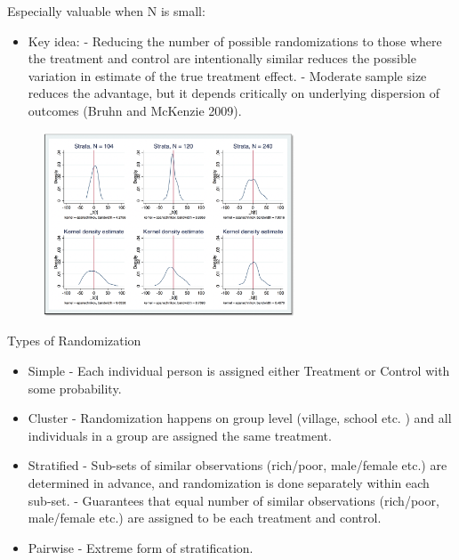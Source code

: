 \documentclass[aspectratio=169]{beamer}
\begin{document}
\begin{frame}[fragile]{Especially valuable when N is small:}
\begin{multicols}{2}	
	
	\begin{itemize}[<default overlay specification>]	
		\item<1>  Key idea:
		\newline - Reducing the number of possible randomizations to those where the treatment and control are intentionally similar reduces the possible variation in estimate of the true treatment effect.
		\newline - Moderate sample size reduces the advantage, but it depends critically on underlying dispersion of outcomes (Bruhn and McKenzie 2009).
	\end{itemize}
	
	\begin{figure}
		\centering
		\includegraphics[width=75mm]{img/Small_N}
	\end{figure}
	
\end{multicols}
\end{frame}


\begin{frame}{Types of Randomization}

\begin{itemize}[<default overlay specification>]
	\item<1> Simple
		\newline - Each individual person is assigned either Treatment or Control with some probability.
	\item<1> Cluster
		\newline - Randomization happens on group level (village, school etc. ) and all individuals in a group are assigned the same treatment. 
	\item<1> Stratified
		\newline - Sub-sets of similar observations (rich/poor, male/female etc.) are determined in advance, and randomization is done separately within each sub-set. 
		\newline - Guarantees that equal number of similar observations (rich/poor, male/female etc.) are assigned to be each treatment and control.
	\item<1> Pairwise
		\newline - Extreme form of stratification. 
\end{itemize}

\end{frame}
\end{document}
